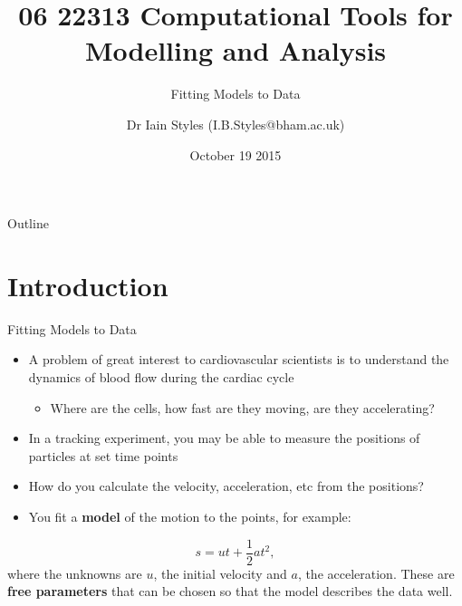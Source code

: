 \documentclass{beamer}
\title{06 22313 Computational Tools for Modelling and Analysis}
\subtitle{Fitting Models to Data}
\author{Dr Iain Styles (I.B.Styles@bham.ac.uk)}
\institute{School of Computer Science, University of Birmingham}
\date{October 19 2015}
\begin{document}
\begin{frame}
  \titlepage
\end{frame}

\begin{frame}{Outline}
  \tableofcontents
\end{frame}



\section{Introduction}



\begin{frame}{Fitting Models to Data}
  \begin{itemize}
    \item A problem of great interest to cardiovascular scientists is to understand the dynamics of blood flow during the cardiac cycle
      \begin{itemize}
        \item Where are the cells, how fast are they moving, are they accelerating?
      \end{itemize}
    \item In a tracking experiment, you may be able to measure the positions of particles at set time points
    \item How do you calculate the velocity, acceleration, etc from the positions?
    \item You fit a \textbf{model} of the motion to the points, for example:
  \end{itemize}
  \begin{equation*}
    s=ut+\frac{1}{2}at^2, 
  \end{equation*}
  where the unknowns are $u$, the initial velocity and $a$, the acceleration. These are \textbf{free parameters} that can be chosen so that the model describes the data well.
\end{frame}
\end{document}
